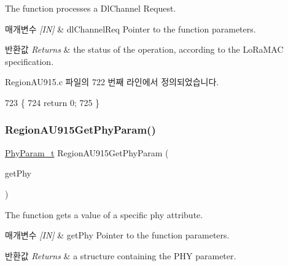 The function processes a Dl\+Channel Request. 


\begin{DoxyParams}{매개변수}
{\em \mbox{[}\+I\+N\mbox{]}} & dl\+Channel\+Req Pointer to the function parameters.\\
\hline
\end{DoxyParams}

\begin{DoxyRetVals}{반환값}
{\em Returns} & the status of the operation, according to the Lo\+Ra\+M\+AC specification. \\
\hline
\end{DoxyRetVals}


Region\+A\+U915.\+c 파일의 722 번째 라인에서 정의되었습니다.


\begin{DoxyCode}
723 \{
724     \textcolor{keywordflow}{return} 0;
725 \}
\end{DoxyCode}
\mbox{\label{group___r_e_g_i_o_n_a_u915_ga91322f6f4dc9d6155316edd4dc198830}} 
\subsubsection{\texorpdfstring{Region\+A\+U915\+Get\+Phy\+Param()}{RegionAU915GetPhyParam()}}
{\footnotesize\ttfamily \mbox{\hyperlink{group___r_e_g_i_o_n_gaed159b26e5c4677236b6e8677019db30}{Phy\+Param\+\_\+t}} Region\+A\+U915\+Get\+Phy\+Param (\begin{DoxyParamCaption}\item[{\mbox{\hyperlink{group___r_e_g_i_o_n_gab471483fff904f4f89bbc03f7fc380ab}{Get\+Phy\+Params\+\_\+t}} $\ast$}]{get\+Phy }\end{DoxyParamCaption})}



The function gets a value of a specific phy attribute. 


\begin{DoxyParams}{매개변수}
{\em \mbox{[}\+I\+N\mbox{]}} & get\+Phy Pointer to the function parameters.\\
\hline
\end{DoxyParams}

\begin{DoxyRetVals}{반환값}
{\em Returns} & a structure containing the P\+HY parameter. \\
\hline
\end{DoxyRetVals}


